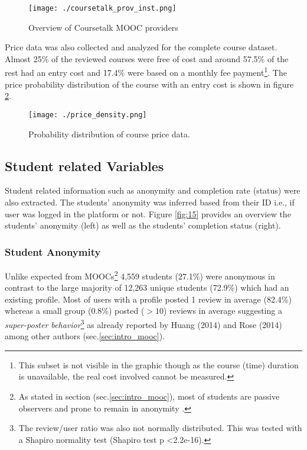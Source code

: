 \documentclass[
	a4paper,
	pdftex,
	12pt,	
	footinclude=true,
	fleqn,
	final,
	]{report}%
\begin{document}
\begin{figure}[h!]
 \centering
 \texttt{[image: ./coursetalk\_prov\_inst.png]}
 \caption{Overview of Coursetalk MOOC providers}
 \label{fig:10}
\end{figure}
\vspace{-0.3cm}

Price data was also collected and analyzed for the complete course dataset. Almost 25\% of the reviewed 
courses were free of cost and around 57.5\% of the rest had an entry cost and 17.4\% were based on a monthly
fee payment\footnote{This subset is not visible in the graphic though as the course (time)
duration is unavailable, the real cost involved cannot be measured.}. The price probability distribution 
of the course with an entry cost is shown in figure \ref{fig:11}.
\begin{figure}[h]
 \centering
 \texttt{[image: ./price\_density.png]}
 \caption{Probability distribution of course price data.}
 \label{fig:11}
\end{figure}
\vspace{-0.45cm}
\subsection[Student related Variables]{Student related Variables}
\label{sec:status}
Student related information such as anonymity and completion rate (status) were also extracted.
The students' anonymity was inferred based from their ID i.e., if user was logged in the 
platform or not. Figure \ref{fig:15} provides an overview the students' anonymity (left) 
as well as the students' completion status (right).
\vspace{-0.4cm}
\subsubsection*{Student Anonymity}
\vspace{-0.4cm}
Unlike expected from MOOCs\footnote{As stated in section (sec.\ref{sec:intro_mooc}), 
most of students are passive observers \cite{Christensen2013}
and prone to remain in anonymity \cite{Hayes2015}.} 4,559 students (27.1\%)
were anonymous in contrast to the large majority of 12,263 unique students (72.9\%) 
which had an existing profile. Most of users with a profile posted 1 review in 
average (82.4\%) whereas a small group (0.8\%) posted ($>10$) reviews in average
suggesting a \emph{super-poster behavior}\footnote{
The review/user ratio was also not normally distributed. This was tested with a Shapiro normality 
test (Shapiro test p <2.2e-16).} \cite{Huang2014} as already reported
by Huang (2014) and Rose (2014) among other authors (sec.\ref{sec:intro_mooc}).
\vspace{-0.4cm}
\end{document}
